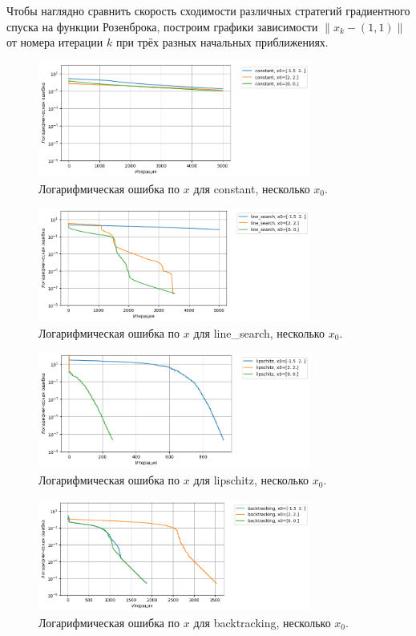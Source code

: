 \documentclass[a4paper,12pt]{article}
\begin{document}
Чтобы наглядно сравнить скорость сходимости различных стратегий градиентного спуска на функции Розенброка, построим графики зависимости $\|x_k - (1,1)\|$ от номера итерации $k$ при трёх разных начальных приближениях.
\begin{figure}[H]
    \centering
    \includegraphics[width=0.8\textwidth]{images/task2/convergence_x_error_2_3_constant.png}
    \caption{Логарифмическая ошибка по $x$ для constant, несколько $x_0$.}
\end{figure}
\begin{figure}[H]
    \centering
    \includegraphics[width=0.8\textwidth]{images/task2/convergence_x_error_2_3_line_search.png}
    \caption{Логарифмическая ошибка по $x$ для line\_search, несколько $x_0$.}
\end{figure}
\begin{figure}[H]
    \centering
    \includegraphics[width=0.8\textwidth]{images/task2/convergence_x_error_2_3_lipschitz.png}
    \caption{Логарифмическая ошибка по $x$ для lipschitz, несколько $x_0$.}
\end{figure}
\begin{figure}[H]
    \centering
    \includegraphics[width=0.8\textwidth]{images/task2/convergence_x_error_2_3_backtracking.png}
    \caption{Логарифмическая ошибка по $x$ для backtracking, несколько $x_0$.}
\end{figure}
\end{document}
